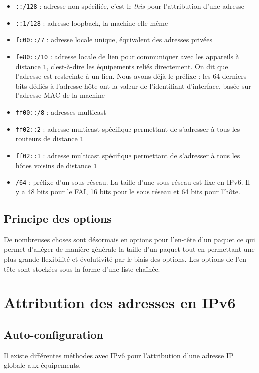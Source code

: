 \begin{itemize}
\item	\texttt{::/128} : adresse non spécifiée, c’est le \emph{this} pour l’attribution d’une adresse\item	\texttt{::1/128} : adresse loopback, la machine elle-même\item	\texttt{fc00::/7} : adresse locale unique, équivalent des adresses privées\item \texttt{fe80::/10} : adresse locale de lien pour communiquer avec les appareils à distance \texttt{1}, c’est-à-dire les équipements reliés directement. On dit que l’adresse est restreinte à un lien. Nous avons déjà le préfixe : les 64 derniers bits dédiés à l’adresse hôte ont la valeur de l’identifiant d’interface, basée sur l’adresse MAC de la machine\item \texttt{ff00::/8} : adresses multicast\item \texttt{ff02::2} : adresse multicast spécifique permettant de s’adresser à tous les routeurs de distance \texttt{1}\item \texttt{ff02::1} : adresse multicast spécifique permettant de s’adresser à tous les hôtes voisins de distance \texttt{1}\item \texttt{/64} : préfixe d’un sous réseau. La taille d’une sous réseau est fixe en IPv6. Il y a 48 bits pour le FAI, 16 bits pour le sous réseau et 64 bits pour l’hôte.
\end{itemize}

\subsection{Principe des options}

De nombreuses choses sont désormais en options pour l’en-tête d’un paquet ce qui permet d’alléger de manière générale la taille d’un paquet tout en permettant une plus grande flexibilité et évolutivité par le biais des options. Les options de l’en-tête sont stockées sous la forme d’une liste chaînée.

\section{Attribution des adresses en IPv6}

\subsection{Auto-configuration}

Il existe différentes méthodes avec IPv6 pour l’attribution d’une adresse IP globale aux équipements.

